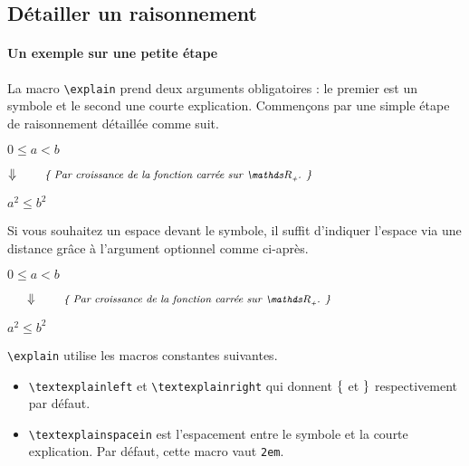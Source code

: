 \documentclass[12pt,a4paper]{article}
\theoremstyle{definition}
\begin{document}





\subsection{Détailler un raisonnement} \label{explain-proof}

\paragraph{Un exemple sur une petite étape}

La macro \verb+\explain+ prend deux arguments obligatoires : le premier est un symbole et le second une courte explication. Commençons par une simple étape de raisonnement détaillée comme suit.

\begin{tcblisting}{}
$0 \leq a < b$

$\explain{\vimplies}{Par croissance de la fonction carrée sur $\RRp$.}$

$a^2 \leq b^2$
\end{tcblisting}

Si vous souhaitez un espace devant le symbole, il suffit d'indiquer l'espace via une distance grâce à l'argument optionnel comme ci-après.

\begin{tcblisting}{}
$0 \leq a < b$

$\explain[1.5em]{\vimplies}{Par croissance de la fonction carrée sur $\RRp$.}$

$a^2 \leq b^2$
\end{tcblisting}


\verb+\explain+ utilise les macros constantes suivantes.
\begin{itemize}
    \item \verb+\textexplainleft+ et \verb+\textexplainright+ qui donnent $\{$ et $\}$ respectivement par défaut.

    \item \verb+\textexplainspacein+ est l'espacement entre le symbole et la courte explication. Par défaut, cette macro vaut \verb+2em+.
\end{itemize}
\end{document}

